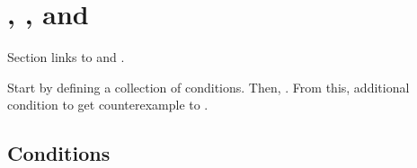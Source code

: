 \section{, \qWhyV{}, and \issueConstraint{}}
\label{sec:comining-ingredients}

\begin{note}
  Section links  to \qWhyV{} and \issueConstraint{}.

  Start by defining a collection of conditions.
  Then, \qWhy{}.
  From this, additional condition to get counterexample to \issueConstraint{}.
\end{note}

\subsection{Conditions}
\label{sec:conditions}

